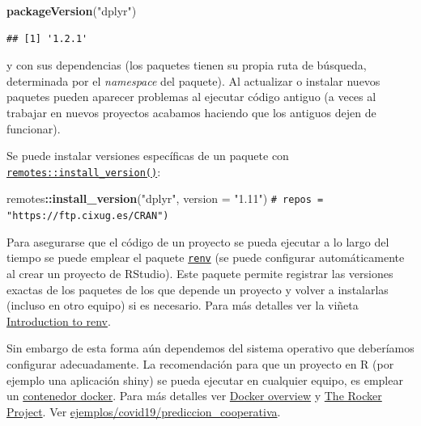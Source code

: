 \documentclass[
]{book}
\newenvironment{Shaded}{\begin{snugshade}}{\end{snugshade}}
\newcommand{\AttributeTok}[1]{\textcolor[rgb]{0.13,0.29,0.53}{#1}}
\newcommand{\CommentTok}[1]{\textcolor[rgb]{0.56,0.35,0.01}{\textit{#1}}}
\newcommand{\FunctionTok}[1]{\textcolor[rgb]{0.13,0.29,0.53}{\textbf{#1}}}
\newcommand{\NormalTok}[1]{#1}
\newcommand{\SpecialCharTok}[1]{\textcolor[rgb]{0.81,0.36,0.00}{\textbf{#1}}}
\newcommand{\StringTok}[1]{\textcolor[rgb]{0.31,0.60,0.02}{#1}}
\theoremstyle{break}
\theoremstyle{nonumberplain}
\renewcommand{\CommentTok}[1]{\textcolor[rgb]{0.41,0.41,0.41}{\texttt{#1}}}
\begin{document}
\begin{Shaded}
\begin{Highlighting}[]
\FunctionTok{packageVersion}\NormalTok{(}\StringTok{"dplyr"}\NormalTok{)}
\end{Highlighting}
\end{Shaded}

\begin{verbatim}
## [1] '1.2.1'
\end{verbatim}

y con sus dependencias (los paquetes tienen su propia ruta de búsqueda, determinada por el \emph{namespace} del paquete).
Al actualizar o instalar nuevos paquetes pueden aparecer problemas al ejecutar código antiguo (a veces al trabajar en nuevos proyectos acabamos haciendo que los antiguos dejen de funcionar).

Se puede instalar versiones específicas de un paquete con \href{https://remotes.r-lib.org/reference/install_version.html}{\texttt{remotes::install\_version()}}:

\begin{Shaded}
\begin{Highlighting}[]
\NormalTok{remotes}\SpecialCharTok{::}\FunctionTok{install\_version}\NormalTok{(}\StringTok{"dplyr"}\NormalTok{, }\AttributeTok{version =} \StringTok{"1.11"}\NormalTok{) }\CommentTok{\# repos = "https://ftp.cixug.es/CRAN")}
\end{Highlighting}
\end{Shaded}

Para asegurarse que el código de un proyecto se pueda ejecutar a lo largo del tiempo se puede emplear el paquete \href{https://rstudio.github.io/renv/}{\texttt{renv}} (se puede configurar automáticamente al crear un proyecto de RStudio).
Este paquete permite registrar las versiones exactas de los paquetes de los que depende un proyecto y volver a instalarlas (incluso en otro equipo) si es necesario. Para más detalles ver la viñeta \href{https://rstudio.github.io/renv/articles/renv.html}{Introduction to renv}.

Sin embargo de esta forma aún dependemos del sistema operativo que deberíamos configurar adecuadamente.
La recomendación para que un proyecto en R (por ejemplo una aplicación shiny) se pueda ejecutar en cualquier equipo, es emplear un \href{https://es.wikipedia.org/wiki/Docker_(software)}{contenedor docker}.
Para más detalles ver \href{https://docs.docker.com/get-started/overview/}{Docker overview} y \href{https://rocker-project.org/}{The Rocker Project}.
Ver \href{ejemplos/covid19/prediccion_cooperativa/vii_xornadasr.html}{ejemplos/covid19/prediccion\_cooperativa}.
\end{document}

